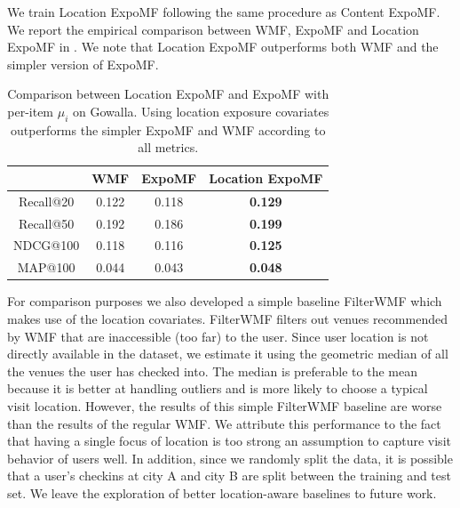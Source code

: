 
 We train Location ExpoMF following the same procedure as
Content ExpoMF. We report the empirical comparison between \gls{WMF}, ExpoMF and
Location ExpoMF in . We note that Location
ExpoMF outperforms both \gls{WMF} and the simpler version of ExpoMF. 

\begin{table}
\centering
\begin{tabular}{c c c c}
\toprule
            & WMF & ExpoMF & Location ExpoMF \\ \midrule
  Recall@20 & 0.122 & 0.118 & \textbf{0.129} \\
  Recall@50 & 0.192 & 0.186 & \textbf{0.199} \\
  NDCG@100  & 0.118 & 0.116 & \textbf{0.125} \\
  MAP@100   & 0.044 & 0.043 & \textbf{0.048} \\
\bottomrule
\end{tabular}
\caption{Comparison between Location ExpoMF and ExpoMF with per-item
$\mu_i$ on Gowalla. Using location exposure covariates outperforms the
simpler ExpoMF and WMF according to all metrics.}
\label{chpt:expomf:tab:si_location_results}
\end{table}

For comparison purposes we also developed a simple baseline Filter\gls{WMF} which makes use of the
location covariates. Filter\gls{WMF} filters out venues recommended by \gls{WMF} that are inaccessible (too far) to the user. Since user
location is not directly available in the dataset, we estimate it using the
geometric median of all the venues the user has checked into. 
The median is preferable to the mean because it is better at handling outliers and is more likely to choose a typical visit location. 
However, the results of this simple Filter\gls{WMF} baseline are worse than the results of the
regular WMF. We attribute this performance to the fact that having a single focus of location 
is too strong an assumption to capture visit behavior of users well. 
In addition, since we randomly split the data, it is possible that a user's
checkins at city A and city B are split between the training and test set.
We leave the exploration of better location-aware baselines to future work. 


